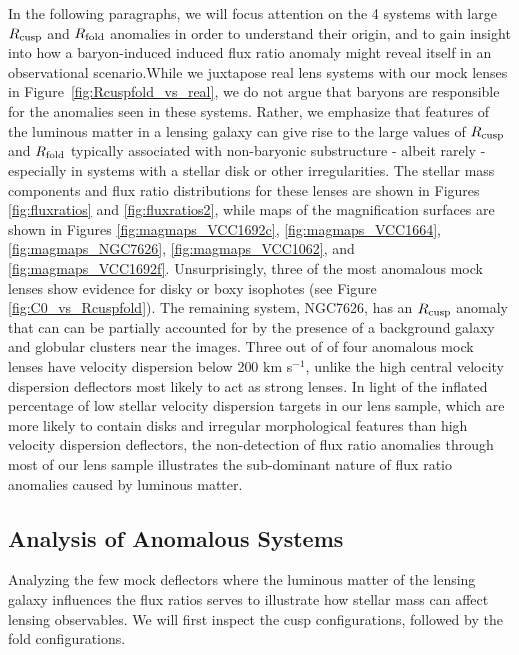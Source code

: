 In the following paragraphs, we will focus attention on the 4 systems with large $R_{\rm{cusp}}$ and $R_{\rm{fold}}$ anomalies in order to understand their origin, and to gain insight into how a baryon-induced induced flux ratio anomaly might reveal itself in an observational scenario.While we juxtapose real lens systems with our mock lenses in Figure~\ref{fig:Rcuspfold_vs_real}, we do not argue that baryons are responsible for the anomalies seen in these systems. Rather, we emphasize that features of the luminous matter in a lensing galaxy can give rise to the large values of $R_{\rm{cusp}}$ and $R_{\rm{fold}}$ typically associated with non-baryonic substructure - albeit rarely - especially in systems with a stellar disk or other irregularities. The stellar mass components and flux ratio distributions for these lenses are shown in Figures \ref{fig:fluxratios} and \ref{fig:fluxratios2}, while maps of the magnification surfaces are shown in Figures \ref{fig:magmaps_VCC1692c}, \ref{fig:magmaps_VCC1664}, \ref{fig:magmaps_NGC7626}, \ref{fig:magmaps_VCC1062}, and \ref{fig:magmaps_VCC1692f}.
Unsurprisingly, three of the most anomalous mock lenses show evidence for disky or boxy isophotes (see Figure \ref{fig:C0_vs_Rcuspfold}). The remaining system, NGC7626, has an $R_{\rm{cusp}}$ anomaly that can can be partially accounted for by the presence of a background galaxy and globular clusters near the images. Three out of of four anomalous mock lenses have velocity dispersion below 200 km s$^{-1}$, unlike the high central velocity dispersion deflectors most likely to act as strong lenses. In light of the inflated percentage of low stellar velocity dispersion targets in our lens sample, which are more likely to contain disks and irregular morphological features than high velocity dispersion deflectors, the non-detection of flux ratio anomalies through most of our lens sample illustrates the sub-dominant nature of flux ratio anomalies caused by luminous matter. 
\subsection{Analysis of Anomalous Systems}
Analyzing the few mock deflectors where the luminous matter of the lensing galaxy influences the flux ratios serves to illustrate how stellar mass can affect lensing observables. We will first inspect the cusp configurations, followed by the fold configurations.

